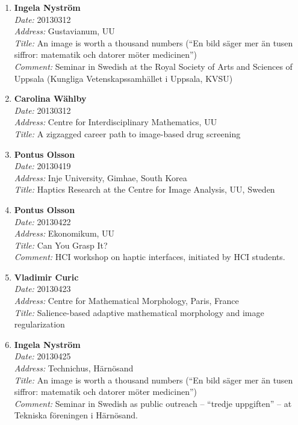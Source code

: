\begin{enumerate}
\item 
{\bf Ingela Nystr\"{o}m}~\\
{\em Date:} 20130312~\\
{\em Address:} Gustavianum, UU~\\
{\em Title:} An image is worth a thousand numbers (``En bild s\"{a}ger mer \"{a}n tusen siffror: matematik och datorer m\"{o}ter medicinen'')~\\
{\em Comment:} Seminar in Swedish at the Royal Society of Arts and Sciences of Uppsala (Kungliga Vetenskapssamh\"{a}llet i Uppsala, KVSU)

\item 
{\bf Carolina W\"{a}hlby}~\\
{\em Date:} 20130312~\\
{\em Address:} Centre for Interdisciplinary Mathematics, UU~\\
{\em Title:} A zigzagged career path to image-based drug screening


\item 
{\bf Pontus Olsson}~\\
{\em Date:} 20130419~\\
{\em Address:} Inje University, Gimhae, South Korea~\\
{\em Title:} Haptics Research at the Centre for Image Analysis, UU, Sweden


\item 
{\bf Pontus Olsson}~\\
{\em Date:} 20130422~\\
{\em Address:} Ekonomikum, UU~\\
{\em Title:} Can You Grasp It?~\\
{\em Comment:} HCI workshop on haptic interfaces, initiated by HCI students.


%
\item 
{\bf Vladimir Curic}~\\
{\em Date:} 20130423~\\
{\em Address:} Centre for Mathematical Morphology, Paris, France~\\
{\em Title:} Salience-based adaptive mathematical morphology and image regularization


\item 
{\bf Ingela Nystr\"{o}m}~\\
{\em Date:} 20130425~\\
{\em Address:} Technichus, H\"{a}rn\"{o}sand~\\
{\em Title:} An image is worth a thousand numbers (``En bild s\"{a}ger mer \"{a}n tusen siffror: matematik och datorer m\"{o}ter medicinen'')~\\
{\em Comment:} Seminar in Swedish as public outreach -- ``tredje uppgiften'' -- at Tekniska f\"{o}reningen i H\"{a}rn\"{o}sand.


\end{enumerate}

